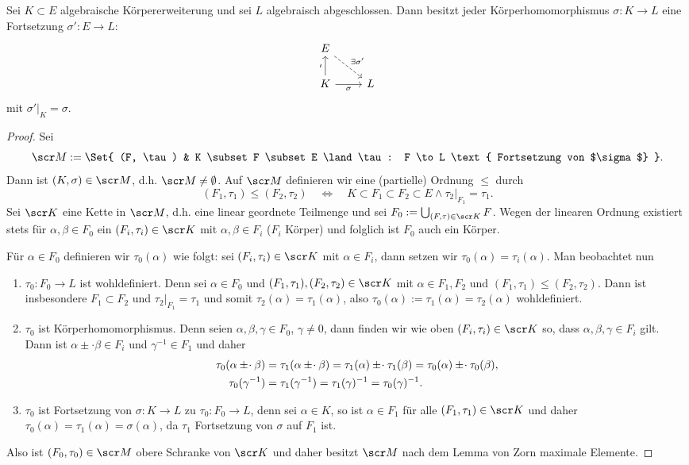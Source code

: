 \begin{st}[Fortsetzungsatz] \label{18.4-7}
	Sei $K \subset E$ algebraische Körpererweiterung und sei $L$ algebraisch abgeschlossen.
	Dann besitzt jeder Körperhomomorphismus $\sigma: K \to L$ eine Fortsetzung $\sigma': E \to L$:
	\[
		\begin{tikzcd}
			E \arrow[dashed]{dr}{\exists \sigma'} & \\
			K \arrow{u}{\iota} \arrow[swap]{r}{\sigma} & L
		\end{tikzcd}
	\]
	mit $\sigma'|_K = \sigma$.
	\begin{proof}
		Sei
		\[
			\scr M
			:= \Set{ (F, \tau) & K \subset F \subset E \land \tau: F \to L \text{ Fortsetzung von $\sigma$} }.
		\]
		Dann ist $(K, \sigma) \in \scr M$, d.h. $\scr M \neq \emptyset$.
		Auf $\scr M$ definieren wir eine (partielle) Ordnung $\le$ durch
		\[
			(F_1, \tau_1) \le (F_2, \tau_2)
			\quad\iff\quad
			K \subset F_1 \subset F_2 \subset E
			\land \tau_2|_{F_1} = \tau_1.
		\]
		Sei $\scr K$ eine Kette in $\scr M$, d.h. eine linear geordnete Teilmenge und sei $F_0 := \bigcup_{(F,\tau) \in \scr K} F$.
		Wegen der linearen Ordnung existiert stets für $\alpha, \beta \in F_0$ ein $(F_i, \tau_i) \in \scr K$ mit $\alpha, \beta \in F_i$ ($F_i$ Körper) und folglich ist $F_0$ auch ein Körper.

		Für $\alpha \in F_0$ definieren wir $\tau_0(\alpha)$ wie folgt:
		sei $(F_i, \tau_i) \in \scr K$ mit $\alpha \in F_i$, dann setzen wir $\tau_0(\alpha) = \tau_i(\alpha)$.
		Man beobachtet nun
		\begin{enumerate}[1)]
			\item
				$\tau_0 : F_0 \to L$ ist wohldefiniert.
				Denn sei $\alpha \in F_0$ und $(F_1, \tau_1), (F_2, \tau_2) \in \scr K$ mit $\alpha \in F_1, F_2$ und \oBdA $(F_1, \tau_1) \le (F_2, \tau_2)$.
				Dann ist insbesondere $F_1 \subset F_2$ und $\tau_2|_{F_1} = \tau_1$ und somit $\tau_2(\alpha) = \tau_1(\alpha)$, also $\tau_0(\alpha) := \tau_1(\alpha) = \tau_2(\alpha)$ wohldefiniert.
			\item
				$\tau_0$ ist Körperhomomorphismus.
				Denn seien $\alpha, \beta, \gamma \in F_0$, $\gamma \neq 0$, dann finden wir wie oben $(F_i, \tau_i) \in \scr K$ so, dass $\alpha, \beta, \gamma \in F_i$ gilt.
				Dann ist $\alpha \pm \cdot \beta \in F_i$ und $\gamma^{-1} \in F_1$ und daher
				\begin{align*}
					\tau_0(\alpha \mathbin { \pm \mkern1mu \cdot } \beta)
					&= \tau_1(\alpha \mathbin { \pm \mkern1mu \cdot } \beta)
					= \tau_1(\alpha) \mathbin { \pm \mkern1mu \cdot } \tau_1(\beta)
					= \tau_0(\alpha) \mathbin { \pm \mkern1mu \cdot } \tau_0(\beta), \\
					\tau_0(\gamma^{-1})
					&= \tau_1(\gamma^{-1})
					= \tau_1(\gamma)^{-1}
					= \tau_0(\gamma)^{-1}.
				\end{align*}
			\item
				$\tau_0$ ist Fortsetzung von $\sigma: K \to L$ zu $\tau_0: F_0 \to L$, denn sei $\alpha \in K$, so ist $\alpha \in F_1$ für alle $(F_1, \tau_1) \in \scr K$ und daher $\tau_0(\alpha) = \tau_1(\alpha) = \sigma(\alpha)$, da $\tau_1$ Fortsetzung von $\sigma$ auf $F_1$ ist.
		\end{enumerate}
		Also ist $(F_0, \tau_0) \in \scr M$ obere Schranke von $\scr K$ und daher besitzt $\scr M$ nach dem Lemma von Zorn maximale Elemente.


\end{proof}
\end{st}
